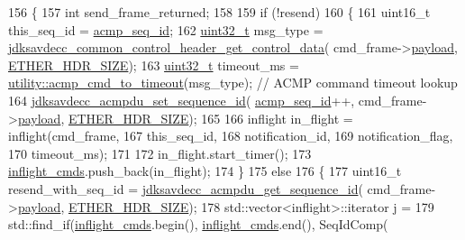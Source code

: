\begin{DoxyCode}
156 \{
157     \textcolor{keywordtype}{int} send\_frame\_returned;
158 
159     \textcolor{keywordflow}{if} (!resend)
160     \{
161         uint16\_t this\_seq\_id = \hyperlink{classavdecc__lib_1_1acmp__controller__state__machine_abc8353807adf298f195ae2f0dc170b51}{acmp\_seq\_id};
162         \hyperlink{parse_8c_a6eb1e68cc391dd753bc8ce896dbb8315}{uint32\_t} msg\_type = 
      \hyperlink{group__jdksavdecc__avtp__common__control__header_gacb435e5d647474931972cb9eb93b4e41}{jdksavdecc\_common\_control\_header\_get\_control\_data}(
      cmd\_frame->\hyperlink{structjdksavdecc__frame_a220ad076814a31ae0163e722e523de46}{payload}, \hyperlink{namespaceavdecc__lib_a6c827b1a0d973e18119c5e3da518e65ca9512ad9b34302ba7048d88197e0a2dc0}{ETHER\_HDR\_SIZE});
163         \hyperlink{parse_8c_a6eb1e68cc391dd753bc8ce896dbb8315}{uint32\_t} timeout\_ms = \hyperlink{namespaceavdecc__lib_1_1utility_a146d6f5e7a915c5e59058fafc6e6402c}{utility::acmp\_cmd\_to\_timeout}(msg\_type); \textcolor{comment}{
      // ACMP command timeout lookup}
164         \hyperlink{group__acmpdu_gac25bc4c2517c617eab5713ab6e1e162d}{jdksavdecc\_acmpdu\_set\_sequence\_id}(
      \hyperlink{classavdecc__lib_1_1acmp__controller__state__machine_abc8353807adf298f195ae2f0dc170b51}{acmp\_seq\_id}++, cmd\_frame->\hyperlink{structjdksavdecc__frame_a220ad076814a31ae0163e722e523de46}{payload}, \hyperlink{namespaceavdecc__lib_a6c827b1a0d973e18119c5e3da518e65ca9512ad9b34302ba7048d88197e0a2dc0}{ETHER\_HDR\_SIZE});
165 
166         inflight in\_flight = inflight(cmd\_frame,
167                                       this\_seq\_id,
168                                       notification\_id,
169                                       notification\_flag,
170                                       timeout\_ms);
171 
172         in\_flight.start\_timer();
173         \hyperlink{classavdecc__lib_1_1acmp__controller__state__machine_a0475b054c1890c88809394d9cef2a4c0}{inflight\_cmds}.push\_back(in\_flight);
174     \}
175     \textcolor{keywordflow}{else}
176     \{
177         uint16\_t resend\_with\_seq\_id = \hyperlink{group__acmpdu_gaf20d00ac6431b19d3f1213b4b6bf6fd5}{jdksavdecc\_acmpdu\_get\_sequence\_id}(
      cmd\_frame->\hyperlink{structjdksavdecc__frame_a220ad076814a31ae0163e722e523de46}{payload}, \hyperlink{namespaceavdecc__lib_a6c827b1a0d973e18119c5e3da518e65ca9512ad9b34302ba7048d88197e0a2dc0}{ETHER\_HDR\_SIZE});
178         std::vector<inflight>::iterator j =
179             std::find\_if(\hyperlink{classavdecc__lib_1_1acmp__controller__state__machine_a0475b054c1890c88809394d9cef2a4c0}{inflight\_cmds}.begin(), \hyperlink{classavdecc__lib_1_1acmp__controller__state__machine_a0475b054c1890c88809394d9cef2a4c0}{inflight\_cmds}.end(), SeqIdComp(

\end{DoxyCode}
